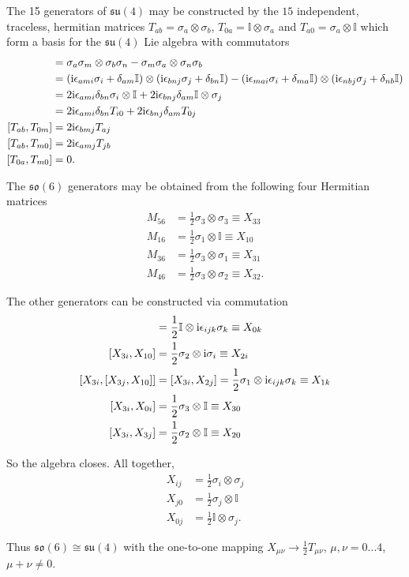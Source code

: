 \documentclass[main.tex]{subfiles}
\begin{document}
The 15 generators of $\mathfrak{su}(4)$ may be constructed by the $15$ independent, traceless, hermitian matrices $T_{ab}=\sigma_a\otimes\sigma_b$, $T_{0a}=\mathbb{I}\otimes\sigma_a$ and $T_{a0}=\sigma_a\otimes\mathbb{I}$ which form a basis for the $\mathfrak{su}(4)$ Lie algebra with commutators
\begin{align}
[T_{ab},T_{mn}]&=\sigma_a\sigma_m\otimes\sigma_b\sigma_n-\sigma_m\sigma_a\otimes\sigma_n\sigma_b\\
&=(\img\epsilon_{ami}\sigma_i+\delta_{am}\mathbb{I})\otimes(\img\epsilon_{bnj}\sigma_j+\delta_{bn}\mathbb{I})-(\img\epsilon_{mai}\sigma_i+\delta_{ma}\mathbb{I})\otimes(\img\epsilon_{nbj}\sigma_j+\delta_{nb}\mathbb{I})\\
&=2\img\epsilon_{ami}\delta_{bn}\sigma_i\otimes\mathbb{I}+2\img\epsilon_{bnj}\delta_{am}\mathbb{I}\otimes\sigma_j\\
&=2\img\epsilon_{ami}\delta_{bn}T_{i0}+2\img\epsilon_{bnj}\delta_{am}T_{0j}\\
[T_{ab},T_{0m}]&=2\img\epsilon_{bmj}T_{aj}\\
[T_{ab},T_{m0}]&=2\img\epsilon_{amj}T_{jb}\\
[T_{0a},T_{m0}]&=0.
\end{align}

The $\mathfrak{so}(6)$ generators may be obtained from the following four Hermitian matrices
\begin{align}
M_{56}&=\frac{1}{2}\sigma_3\otimes\sigma_3\equiv X_{33}\\
M_{16}&=\frac{1}{2}\sigma_1\otimes\mathbb{I}\equiv X_{10}\\
M_{36}&=\frac{1}{2}\sigma_3\otimes\sigma_1\equiv X_{31}\\
M_{46}&=\frac{1}{2}\sigma_3\otimes\sigma_2\equiv X_{32}.
\end{align}

The other generators can be constructed via commutation
\begin{align}
[X_{3i},X_{3j}]&=\frac{1}{2}\mathbb{I}\otimes\img\epsilon_{ijk}\sigma_{k}\equiv X_{0k}\\
[X_{3i},X_{10}]&=\frac{1}{2}\sigma_2\otimes\img\sigma_{i}\equiv X_{2i}\\
[X_{3i},[X_{3j},X_{10}]]&=[X_{3i},X_{2j}]=\frac{1}{2}\sigma_1\otimes\img\epsilon_{ijk}\sigma_{k}\equiv X_{1k}\\
[X_{3i},X_{0i}]&=\frac{1}{2}\sigma_3\otimes\mathbb{I}\equiv X_{30}\\
[X_{3i},X_{3j}]&=\frac{1}{2}\sigma_2\otimes\mathbb{I}\equiv X_{20}
\end{align}

So the algebra closes. All together,
\begin{align}
X_{ij}&=\frac{1}{2}\sigma_i\otimes\sigma_j\\
X_{j0}&=\frac{1}{2}\sigma_j\otimes\mathbb{I}\\
X_{0j}&=\frac{1}{2}\mathbb{I}\otimes\sigma_j.
\end{align}

Thus $\mathfrak{so}(6)\cong\mathfrak{su}(4)$ with the one-to-one mapping $X_{\mu\nu}\rightarrow\frac{1}{2}T_{\mu\nu}$, $\mu,\nu=0...4$, $\mu+\nu\neq0$.
\end{document}
